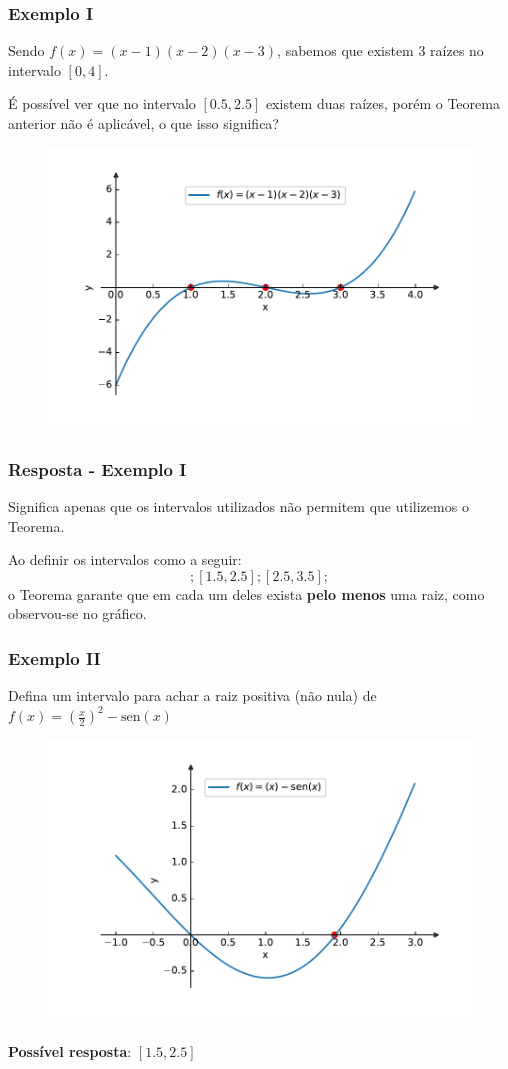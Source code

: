 \documentclass{beamer}
\theoremstyle{mystyle}
\begin{document}
\begin{frame}
	\frametitle{Exemplo I}
	Sendo $ f(x) = (x - 1)(x - 2)(x - 3) $, sabemos que existem 3 raízes no intervalo $ [0, 4] $.
	
	É possível ver que no intervalo $  [0.5, 2.5] $ existem duas raízes, porém o Teorema anterior não é aplicável, o que isso significa?	
	\begin{figure}
		\centering
		\includegraphics[width=0.6\linewidth]{Figuras/grafico_03}
		\label{fig:grafico03}
	\end{figure}
\end{frame}

\begin{frame}
	\frametitle{Resposta - Exemplo I}
	Significa apenas que os intervalos utilizados não permitem que utilizemos o Teorema.
	
	Ao definir os intervalos como a seguir:
	\begin{equation*}
		[0.5,1.5]; [1.5,2.5]; [2.5,3.5];
	\end{equation*}
	o Teorema garante que em cada um deles exista \textbf{pelo menos} uma raiz, como observou-se no gráfico.
\end{frame}

\begin{frame}
	\frametitle{Exemplo II}
	Defina um intervalo para achar a raiz positiva (não nula) de $ f(x) = \left( \frac{x}{2} \right)^{2} - \mbox{sen}(x) $
	\begin{figure}
		\centering
		\includegraphics[width=0.6\linewidth]{Figuras/grafico_04}
		\label{fig:grafico04}
	\end{figure}
	\pause
	\textbf{Possível resposta}: $ [1.5,2.5] $
\end{frame}
\end{document}

